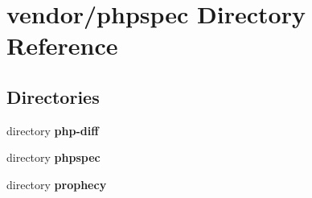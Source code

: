 \section{vendor/phpspec Directory Reference}
\label{dir_0971802febc99584230ade9d0e626c19}
\subsection*{Directories}
\begin{DoxyCompactItemize}
\item 
directory {\bf php-\/diff}
\item 
directory {\bf phpspec}
\item 
directory {\bf prophecy}
\end{DoxyCompactItemize}
